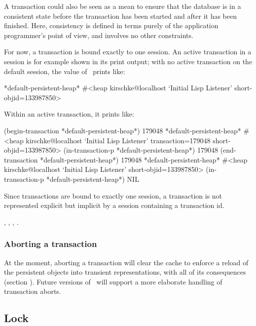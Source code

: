 A transaction could also be seen as a mean to ensure that the database
is in a consistent state before the transaction has been started and
after it has been finished. Here, consistency is defined in terms
purely of the application programmer's point of view, and involves no
other constraints.

For now, a transaction is bound exactly to one session. An active
transaction in a session is for example shown in its print output;
with no active transaction on the default session, the value of
\ prints like:
\begin{CompactCode}
\listener{}*default-persistent-heap*
#<heap kirschke@localhost `Initial Lisp Listener' short-objid=133987850>
\end{CompactCode}

Within an active transaction, it prints like:
\begin{CompactCode}
\listener{}(begin-transaction *default-persistent-heap*)
179048
\listener{}*default-persistent-heap*
#<heap kirschke@localhost `Initial Lisp Listener' transaction=179048
                                                  short-objid=133987850>
\listener{}(in-transaction-p *default-persistent-heap*)
179048
\listener{}(end-transaction *default-persistent-heap*)
179048
\listener{}*default-persistent-heap*
#<heap kirschke@localhost `Initial Lisp Listener' short-objid=133987850>
\listener{}(in-transaction-p *default-persistent-heap*)
NIL
\end{CompactCode}

Since transactions are bound to exactly one session, a transaction is
not represented explicit but implicit by a session containing a
transaction id.

 {}, ,
, .

\subsubsection{Aborting a transaction}%
\label{sec:TransactionAbort}

At the moment, aborting a transaction will clear the cache to enforce
a reload of the persistent objects into transient representations,
with all of its consequences (section ).
Future versions of \plob\ will support a more elaborate handling of
transaction aborts.

\subsection{Lock}%
\label{sec:Locking}


